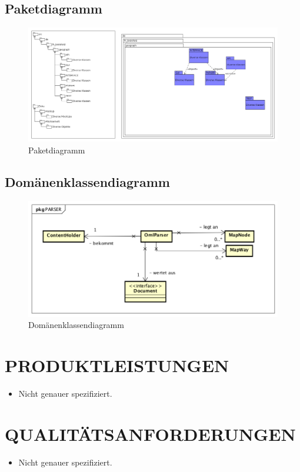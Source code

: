 	\subsection{Paketdiagramm}
		\begin{figure}[H]
			\centering
			\includegraphics[width=0.7\linewidth]{images/Paketdiagramm}
			\caption{Paketdiagramm}
			\label{fig:Paketdiagramm}
		\end{figure}
	\subsection{Domänenklassendiagramm}
		\begin{figure}[H]
			\centering
			\includegraphics[width=0.7\linewidth]{images/DomaenenKlassendiagramm_v2}
			\caption{Domänenklassendiagramm}
			\label{fig:Domänenklassendiagramm}
		\end{figure}
	\section{\Large PRODUKTLEISTUNGEN}
	\begin{itemize}
		\item Nicht genauer spezifiziert.
	\end{itemize} 
		
	
	\section{\Large QUALITÄTSANFORDERUNGEN}
	\begin{itemize}
		\item Nicht genauer spezifiziert.
	\end{itemize}
	
